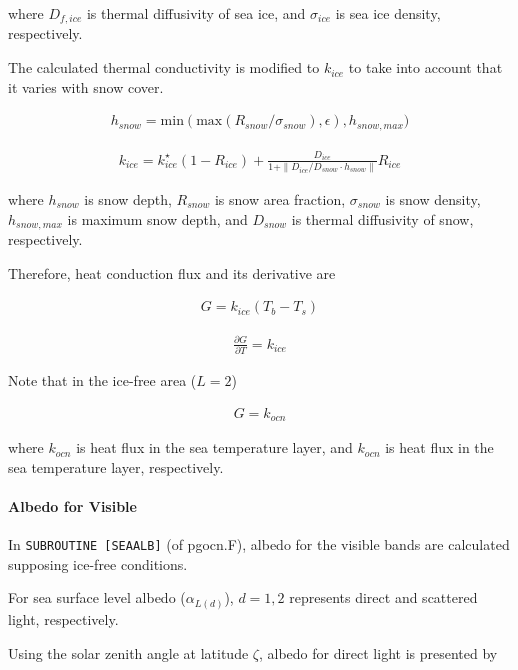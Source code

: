where \(D_{f,ice}\) is thermal diffusivity of sea ice, and
\(\sigma_{ice}\) is sea ice density, respectively.

The calculated thermal conductivity is modified to \(k_{ice}\) to take
into account that it varies with snow cover.

\begin{eqnarray}
h_{snow} = \mathrm{min}(
    \mathrm{max}(
    R_{snow}/\sigma_{snow}),\epsilon
        ),h_{snow,max}
        )
\end{eqnarray}

\begin{eqnarray}      
k_{ice} = k_{ice}^\star (1-R_{ice}) + \frac{D_{ice}}{1+\| D_{ice}/D_{snow} \cdot h_{snow} \|} R_{ice}
\end{eqnarray}

where \(h_{snow}\) is snow depth, \(R_{snow}\) is snow area fraction,
\(\sigma_{snow}\) is snow density, \(h_{snow,max}\) is maximum snow
depth, and \(D_{snow}\) is thermal diffusivity of snow, respectively.

Therefore, heat conduction flux and its derivative are

\begin{eqnarray}
 G = k_{ice} (T_b - T_s)
\end{eqnarray}

\begin{eqnarray}
 \frac{\partial G}{\partial T} = k_{ice}
\end{eqnarray}

Note that in the ice-free area (\(L=2\))

\begin{eqnarray}
G=k_{ocn}
\end{eqnarray}

where \(k_{ocn}\) is heat flux in the sea temperature layer, and
\(k_{ocn}\) is heat flux in the sea temperature layer, respectively.

\hypertarget{albedo-for-visible}{%
\paragraph{Albedo for Visible}\label{albedo-for-visible}}

In \texttt{SUBROUTINE\ {[}SEAALB{]}} (of pgocn.F), albedo for the
visible bands are calculated supposing ice-free conditions.

For sea surface level albedo (\(\alpha_{L(d)}\)), \(d=1,2\) represents
direct and scattered light, respectively.

Using the solar zenith angle at latitude \(\zeta\), albedo for direct
light is presented by

